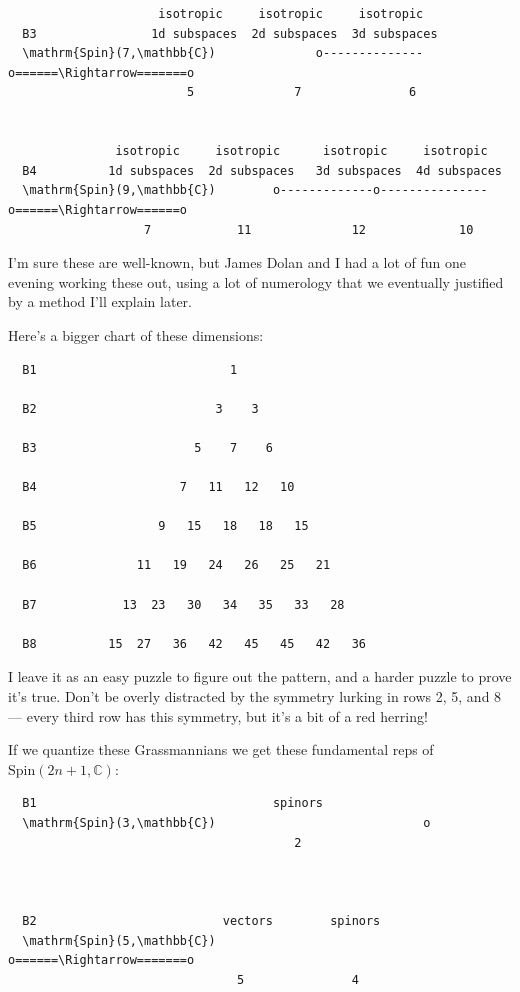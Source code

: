 \documentclass{article}
\begin{document}
\begin{itemize}
\begin{verbatim}
                     isotropic     isotropic     isotropic
  B3                1d subspaces  2d subspaces  3d subspaces
  \mathrm{Spin}(7,\mathbb{C})              o--------------o======\Rightarrow=======o
                         5              7               6


               isotropic     isotropic      isotropic     isotropic
  B4          1d subspaces  2d subspaces   3d subspaces  4d subspaces
  \mathrm{Spin}(9,\mathbb{C})        o-------------o---------------o======\Rightarrow======o
                   7            11              12             10 
\end{verbatim}

  I'm sure these are well-known, but James Dolan and I had a lot of fun
  one evening working these out, using a lot of numerology that we
  eventually justified by a method I'll explain later.

  Here's a bigger chart of these dimensions:

\begin{verbatim}
  B1                           1

  B2                         3    3

  B3                      5    7    6

  B4                    7   11   12   10

  B5                 9   15   18   18   15

  B6              11   19   24   26   25   21

  B7            13  23   30   34   35   33   28

  B8          15  27   36   42   45   45   42   36  
\end{verbatim}

  I leave it as an easy puzzle to figure out the pattern, and a harder
  puzzle to prove it's true. Don't be overly distracted by the symmetry
  lurking in rows 2, 5, and 8 --- every third row has this symmetry, but
  it's a bit of a red herring!

  If we quantize these Grassmannians we get these fundamental reps of
  \(\mathrm{Spin}(2n+1,\mathbb{C})\):

\begin{verbatim}
  B1                                 spinors
  \mathrm{Spin}(3,\mathbb{C})                             o
                                        2



  B2                          vectors        spinors   
  \mathrm{Spin}(5,\mathbb{C})                     o======\Rightarrow=======o
                                5               4




\end{verbatim}
\end{itemize}
\end{document}
